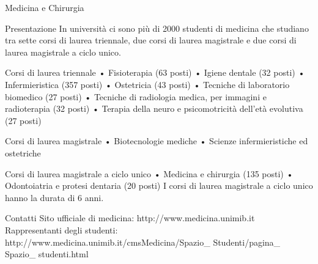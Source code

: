 Medicina e Chirurgia

Presentazione
In università ci sono più di 2000 studenti di medicina che studiano tra sette corsi di laurea triennale, due corsi di laurea magistrale e due corsi di laurea magistrale a ciclo unico. 

Corsi di laurea triennale
      • Fisioterapia (63 posti) 
      • Igiene dentale (32 posti) 
      • Infermieristica (357 posti) 
      • Ostetricia (43 posti) 
      • Tecniche di laboratorio biomedico (27 posti) 
      • Tecniche di radiologia medica, per immagini e radioterapia (32 posti) 
      • Terapia della neuro e psicomotricità dell'età evolutiva (27 posti) 

Corsi di laurea magistrale
      • Biotecnologie mediche 
      • Scienze infermieristiche ed ostetriche

Corsi di laurea magistrale a ciclo unico
      • Medicina e chirurgia (135 posti) 
      • Odontoiatria e protesi dentaria (20 posti) 
I corsi di laurea magistrale a ciclo unico hanno la durata di 6 anni. 

Contatti
Sito ufficiale di medicina: http://www.medicina.unimib.it 
Rappresentanti degli studenti: http://www.medicina.unimib.it/cmsMedicina/Spazio\_ Studenti/pagina\_ Spazio\_ studenti.html 
